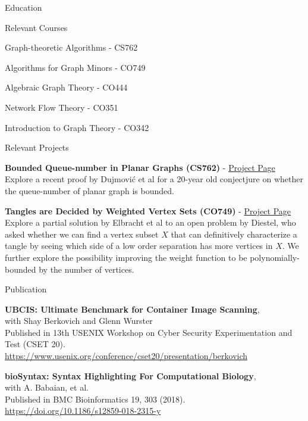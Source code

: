 \documentclass{cv}
\begin{document}
\begin{rSection}{Education}
\begin{rSubsection}{Relevant Courses}{}{}{}
	\item Graph-theoretic Algorithms - CS762
	\item Algorithms for Graph Minors - CO749
	\item Algebraic Graph Theory - CO444
	\item Network Flow Theory - CO351
	\item Introduction to Graph Theory - CO342
\end{rSubsection}

\begin{rSubsection}{Relevant Projects}{}{}{}
	\item \textbf{Bounded Queue-number in Planar Graphs (CS762)} - \href{https://jeffreyhykam.com/writings/}{Project Page}\\
	Explore a recent proof by Dujmovi\'{c} et al for a 20-year old conjectjure on whether the queue-number of planar graph is bounded. \\

	\item \textbf{Tangles are Decided by Weighted Vertex Sets (CO749)} - \href{https://jeffreyhykam.com/writings/}{Project Page}\\
	Explore a partial solution by Elbracht et al to an open problem by Diestel, who asked whether we can find a vertex subset $X$ that can definitively characterize a tangle by seeing which side of a low order separation has more vertices in $X$. We further explore the possibility improving the weight function to be polynomially-bounded by the number of vertices.
\end{rSubsection}
\end{rSection}

\begin{rSection}{Publication}
\begin{rSubsectionPure}
	\item \textbf{{UBCIS}: Ultimate Benchmark for Container Image Scanning}, \\
	with Shay Berkovich and Glenn Wurster \\
	Published in 13th {USENIX} Workshop on Cyber Security Experimentation and Test ({CSET} 20). \\
	\href{https://www.usenix.org/conference/cset20/presentation/berkovich}{https://www.usenix.org/conference/cset20/presentation/berkovich}
\end{rSubsectionPure}

\begin{rSubsectionPure}
	\item \textbf{bioSyntax: Syntax Highlighting For Computational Biology}, \\
	with A. Babaian, et al. \\
	Published in BMC Bioinformatics 19, 303 (2018). \\
	\href{https://doi.org/10.1186/s12859-018-2315-y}{https://doi.org/10.1186/s12859-018-2315-y}
\end{rSubsectionPure}
\end{rSection}
\end{document}
